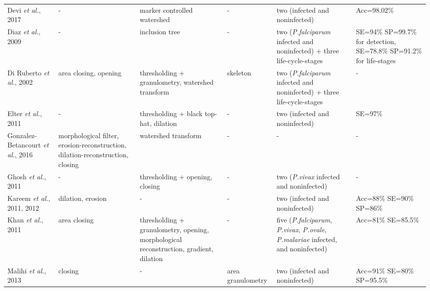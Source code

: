\begin{longtable}{C{1.4cm} C{1.5cm} C{2.1cm} C{1.5cm} C{2.7cm} C{2.2cm} }
Devi \emph{et al.}, 2017 &
	- &
	marker controlled watershed &	
	- &
	two (infected and noninfected)  &
	Acc=98.02\%
	\vspace{0.6cm}
    \\

Diaz \emph{et al.}, 2009 &
	- &
	inclusion tree &	
	- &
	two (\emph{P.falciparum} infected and noninfected) + three life-cycle-stages &
	SE=94\% SP=99.7\% for detection, SE=78.8\% SP=91.2\% for life-stages
\vspace{0.6cm}
	\\

Di Ruberto \emph{et al.}, 2002 &
	area closing, opening &
	thresholding + granulometry, watershed  transform &	
	skeleton &
	two (\emph{P.falciparum} infected and noninfected) + three life-cycle-stages &
	-
\vspace{0.6cm}
	\\

Elter \emph{et al.}, 2011 &
	- &
	thresholding + black top-hat, dilation &	
	- &
	two (infected and noninfected) &
	SE=97\%
	\vspace{0.6cm} \\

Gonzalez-Betancourt \emph{et al.}, 2016  &
   	morphological filter, erosion-reconstruction, dilation-reconstruction, closing &
   	watershed  transform  &
   	- &
   	- &
   	- \vspace{0.6cm} \\	

Ghosh \emph{et al.}, 2011  &
   	- &
   	thresholding + opening, closing  &
   	- &
   	two (\emph{P.vivax} infected and noninfected) &
   	- \vspace{0.6cm} \\

Kareem \emph{et al.}, 2011, 2012  &
   	dilation, erosion &
   	-  &
   	- &
   	two (infected and noninfected) &
   	Acc=88\% SE=90\% SP=86\% \vspace{0.6cm} \\	

Khan \emph{et al.}, 2011  &
   	area closing &
   	thresholding + granulometry, opening, morphological reconstruction, gradient, dilation &
   	- &
   	five (\emph{P.falciparum}, \emph{P.vivax}, \emph{P.ovale}, \emph{P.malariae} infected, and noninfected) &
   	Acc=81\% SE=85.5\% \vspace{0.6cm} \\	

Malihi \emph{et al.}, 2013  &
   	closing &
   	-  &
   	area granulometry &
   	two (infected and noninfected) &
   	Acc=91\% SE=80\% SP=95.5\% \vspace{0.6cm} \\	


\end{longtable}
